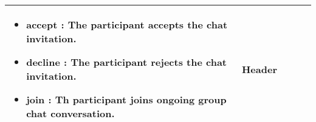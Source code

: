 \begin{longtable}{|>{\raggedright}p{}|>{\raggedright}p{}|>{\raggedright}p{}|>{\raggedright}p{}|>{\raggedright}p{}|}
\begin{itemize}
\item {\footnotesize{accept : The participant accepts the chat invitation.}}{\footnotesize \par}
\item {\footnotesize{decline : The participant rejects the chat invitation.}}{\footnotesize \par}
\item {\footnotesize{join : Th participant joins ongoing group chat conversation.}}\end{itemize}
 & {\footnotesize{Header}}\tabularnewline
\hline 
\end{longtable}



{\footnotesize{}}
